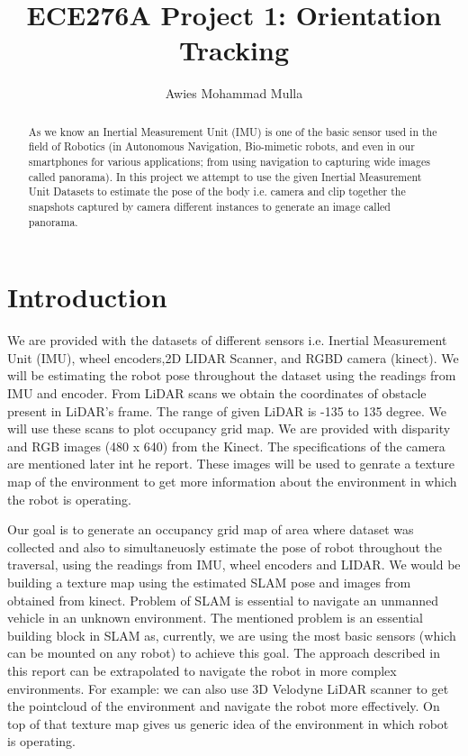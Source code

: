 \documentclass[a4paper]{article}
\title{ECE276A Project 1: Orientation Tracking}
\author{Awies Mohammad Mulla}
\begin{document}
\maketitle

\begin{abstract}
As we know an Inertial Measurement Unit (IMU) is one of the basic sensor used in the field of Robotics (in Autonomous Navigation, Bio-mimetic robots, and even in our smartphones for various applications; from using navigation to capturing wide images called panorama). In this project we attempt to use the given Inertial Measurement Unit Datasets to estimate the pose of the body i.e. camera and clip together the snapshots captured by camera different instances to generate an image called panorama.
\end{abstract}

\section{Introduction}
We are provided with the datasets of different sensors i.e. Inertial Measurement Unit (IMU), wheel encoders,2D LIDAR Scanner, and RGBD camera (kinect). We will be estimating the robot pose throughout the dataset using the readings from IMU and encoder. From LiDAR scans we obtain the coordinates of obstacle present in LiDAR's frame. The range of given LiDAR is -135 to 135 degree. We will use these scans to plot occupancy grid map. We are provided with disparity and RGB images (480 x 640) from the Kinect. The specifications of the camera are mentioned later int he report. These images will be used to genrate a texture map of the environment to get more information about the environment in which the robot is operating.

Our goal is to generate an occupancy grid map of area where dataset was collected and also to simultaneuosly estimate the pose of robot throughout the traversal, using the readings from IMU, wheel encoders and LIDAR. We would be building a texture map using the estimated SLAM pose and images from obtained from kinect. Problem of SLAM is essential to navigate an unmanned vehicle in an unknown environment. The mentioned problem is an essential building block in SLAM as, currently, we are using the most basic sensors (which can be mounted on any robot) to achieve this goal. The approach described in this report can be extrapolated to navigate the robot in more complex environments. For example: we can also use 3D Velodyne LiDAR scanner to get the pointcloud of the environment and navigate the robot more effectively. On top  of that texture map gives us generic idea of the environment in which robot is operating.
\end{document}
